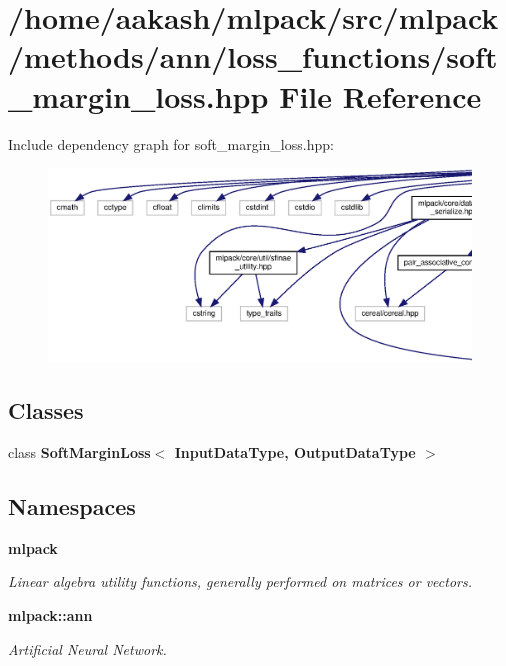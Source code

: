 \section{/home/aakash/mlpack/src/mlpack/methods/ann/loss\+\_\+functions/soft\+\_\+margin\+\_\+loss.hpp File Reference}
\label{soft__margin__loss_8hpp}
Include dependency graph for soft\+\_\+margin\+\_\+loss.\+hpp\+:
\nopagebreak
\begin{figure}[H]
\begin{center}
\leavevmode
\includegraphics[width=350pt]{soft__margin__loss_8hpp__incl}
\end{center}
\end{figure}
\subsection*{Classes}
\begin{DoxyCompactItemize}
\item 
class \textbf{ Soft\+Margin\+Loss$<$ Input\+Data\+Type, Output\+Data\+Type $>$}
\end{DoxyCompactItemize}
\subsection*{Namespaces}
\begin{DoxyCompactItemize}
\item 
 \textbf{ mlpack}
\begin{DoxyCompactList}\small\item\em Linear algebra utility functions, generally performed on matrices or vectors. \end{DoxyCompactList}\item 
 \textbf{ mlpack\+::ann}
\begin{DoxyCompactList}\small\item\em Artificial Neural Network. \end{DoxyCompactList}\end{DoxyCompactItemize}


